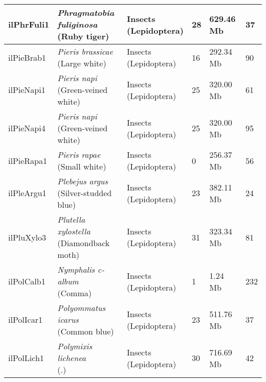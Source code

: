\begin{centering}
\begin{longtable}{l|l|l|l|l|l}
ilPhrFuli1 & \makecell[{l}]{\textit{Phragmatobia fuliginosa} \\ (Ruby tiger)} & \makecell[{l}]{Insects \\ (Lepidoptera)} & 28 & 629.46 Mb & 37  \\ \hline
ilPieBrab1 & \makecell[{l}]{\textit{Pieris brassicae} \\ (Large white)} & \makecell[{l}]{Insects \\ (Lepidoptera)} & 16 & 292.34 Mb & 90  \\ \hline
ilPieNapi1 & \makecell[{l}]{\textit{Pieris napi} \\ (Green-veined white)} & \makecell[{l}]{Insects \\ (Lepidoptera)} & 25 & 320.00 Mb & 61  \\ \hline
ilPieNapi4 & \makecell[{l}]{\textit{Pieris napi} \\ (Green-veined white)} & \makecell[{l}]{Insects \\ (Lepidoptera)} & 25 & 320.00 Mb & 95  \\ \hline
ilPieRapa1 & \makecell[{l}]{\textit{Pieris rapae} \\ (Small white)} & \makecell[{l}]{Insects \\ (Lepidoptera)} & 0 & 256.37 Mb & 56  \\ \hline
ilPleArgu1 & \makecell[{l}]{\textit{Plebejus argus} \\ (Silver-studded blue)} & \makecell[{l}]{Insects \\ (Lepidoptera)} & 23 & 382.11 Mb & 24  \\ \hline
ilPluXylo3 & \makecell[{l}]{\textit{Plutella xylostella} \\ (Diamondback moth)} & \makecell[{l}]{Insects \\ (Lepidoptera)} & 31 & 323.34 Mb & 81  \\ \hline
ilPolCalb1 & \makecell[{l}]{\textit{Nymphalis c-album} \\ (Comma)} & \makecell[{l}]{Insects \\ (Lepidoptera)} & 1 & 1.24 Mb & 232  \\ \hline
ilPolIcar1 & \makecell[{l}]{\textit{Polyommatus icarus} \\ (Common blue)} & \makecell[{l}]{Insects \\ (Lepidoptera)} & 23 & 511.76 Mb & 37  \\ \hline
ilPolLich1 & \makecell[{l}]{\textit{Polymixis lichenea} \\ (.)} & \makecell[{l}]{Insects \\ (Lepidoptera)} & 30 & 716.69 Mb & 42  \\ \hline

\end{longtable}
\end{centering}
